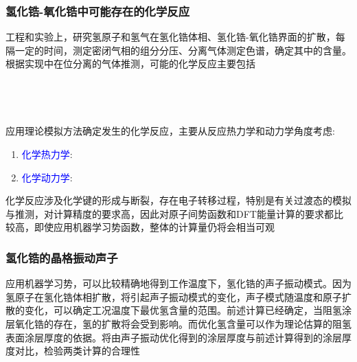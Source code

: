 \frame
{
	\frametitle{氢化锆-氧化锆中可能存在的化学反应}
工程和实验上，研究氢原子和氢气在氢化锆体相、氢化锆-氧化锆界面的扩散，每隔一定的时间，测定密闭气相的组分分压、分离气体测定色谱，确定其中的含量。根据实现中在位分离的气体推测，可能的化学反应主要包括\\
{\centering
	\textrm{}\\
	\textrm{} \\
	\textrm{} \\
	\textrm{}\\
}
应用理论模拟方法确定发生的化学反应，主要从反应热力学和动力学角度考虑:
\begin{enumerate}
	\item \textcolor{blue}{化学热力学}:\\
		{\fontsize{6.2pt}{4.2pt}}
	\item \textcolor{blue}{化学动力学}:\\
		{\fontsize{6.2pt}{4.2pt}}
\end{enumerate}
化学反应涉及化学键的形成与断裂，存在电子转移过程，特别是有关过渡态的模拟与推测，对计算精度的要求高，因此对原子间势函数和\textrm{DFT}能量计算的要求都比较高，即使应用机器学习势函数，整体的计算量仍将会相当可观
}

\frame
{
	\frametitle{氢化锆的晶格振动声子}
应用机器学习势，可以比较精确地得到工作温度下，氢化锆的声子振动模式。因为氢原子在氢化锆体相扩散，将引起声子振动模式的变化，声子模式随温度和原子扩散的变化，可以确定工况温度下最优氢含量的范围。前述计算已经确定，当阻氢涂层氧化锆的存在，氢的扩散将会受到影响。而优化氢含量可以作为理论估算的阻氢表面涂层厚度的依据。将由声子振动优化得到的涂层厚度与前述计算得到的涂层厚度对比，检验两类计算的合理性
}

